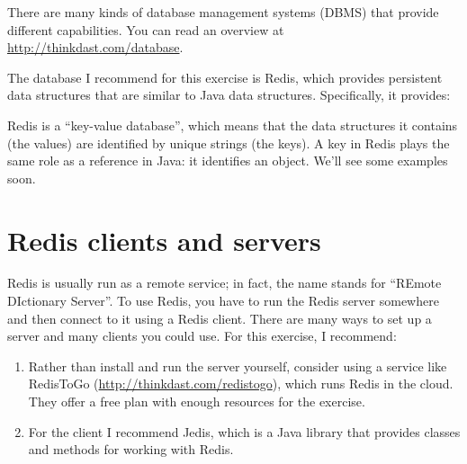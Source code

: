 \documentclass[12pt]{book}
\theoremstyle{exercise}
\newcommand{\java}{\verb}%}
\begin{document}

There are many kinds of database management systems (DBMS) that provide
different capabilities. You can read an overview at
\url{http://thinkdast.com/database}.


The database I recommend for this exercise is Redis, which provides
persistent data structures that are similar to Java data structures.
Specifically, it provides:


Redis is a ``key-value database'', which means that the data structures
it contains (the values) are identified by unique strings (the keys). A
key in Redis plays the same role as a reference in Java: it identifies
an object. We'll see some examples soon.



\section{Redis clients and servers}
\label{redis-clients-and-servers}


Redis is usually run as a remote service; in fact, the name stands for
``REmote DIctionary Server''. To use Redis, you have to run the Redis
server somewhere and then connect to it using a Redis client. There are
many ways to set up a server and many clients you could use. For this
exercise, I recommend:

\begin{enumerate}

\item
  Rather than install and run the server yourself, consider using a
  service like RedisToGo (\url{http://thinkdast.com/redistogo}), which runs
  Redis in the cloud. They offer a free plan with enough resources for
  the exercise.

\item
  For the client I recommend Jedis, which is a Java library that
  provides classes and methods for working with Redis.

\end{enumerate}
\end{document}
